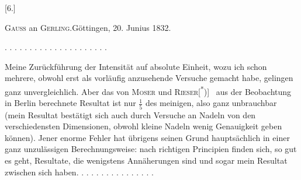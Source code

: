 \clearpage\begingroup{}
\begin{center}[6.]\end{center}
\begin{center}\textsc{Gauss} an \textsc{Gerling}.\quad Göttingen, 20. Junius 1832.\end{center}
\noindent . . . . . . . . . . . . . . . . . . . . .\par
\indent Meine Zurückführung der Intensität auf absolute Einheit, wozu ich
schon mehrere, obwohl erst als vorläufig anzusehende Versuche gemacht habe,
gelingen ganz unvergleichlich. Aber das von \textsc{Moser} und \textsc{Rieser}[\textsuperscript{*})]\begingroup\renewcommand{\thefootnote}{}
\endgroup\ aus der
Beobachtung in Berlin berechnete Resultat ist nur \(\frac{1}{5}\) des meinigen, also ganz
\clearpage{}
\noindent unbrauchbar (mein Resultat bestätigt sich auch durch Versuche an Nadeln
von den verschiedensten Dimensionen, obwohl kleine Nadeln wenig Genauigkeit
geben können). Jener enorme Fehler hat übrigens seinen Grund hauptsächlich
in einer ganz unzulässigen Berechnungsweise: nach richtigen Principien
finden sich, so gut es geht, Resultate, die wenigstens Annäherungen
sind und sogar mein Resultat zwischen sich haben. . . . . . . . . . . . . . . .
\clearpage\endgroup
